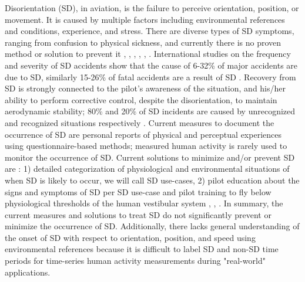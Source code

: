 \documentclass{ieeeaccess}
\begin{document}
 Disorientation (SD), in aviation, is the failure to perceive orientation, position, or movement. It is caused by multiple factors including environmental references and conditions, experience, and stress. There are diverse types of SD symptoms, ranging from confusion to physical sickness, and currently there is no proven method or solution to prevent it \cite{Bles_2008_SD}, \cite{Gibb_2010_Aviation}, \cite{Perdriel_1980_SD}, \cite{Gillingham_1993_Spatial}, \cite{Previc_2004_Spatial}, \cite{Newman_2007_SD}.  International studies on the frequency and severity of SD accidents show that the cause of 6-32\% of major accidents are due to SD, similarly 15-26\% of fatal accidents are a result of SD \cite{Newman_2007_SD}. Recovery from SD is strongly connected to the pilot's awareness of the situation, and his/her ability to perform corrective control, despite the disorientation, to maintain aerodynamic stability; 80\% and 20\% of SD incidents are caused by unrecognized and recognized situations respectively \cite{Bles_2008_SD}. Current measures to document the occurrence of SD are personal reports of physical and perceptual experiences using questionnaire-based methods; measured human activity is rarely used to monitor the occurrence of SD. Current solutions to minimize and/or prevent SD are : 1) detailed categorization of physiological and environmental situations of when SD is likely to occur, we will call SD use-cases, 2) pilot education about the signs and symptoms of SD per SD use-case and pilot training to fly below physiological thresholds of the human vestibular system  \cite{Gillingham_1993_Spatial}, \cite{Newman_2007_SD}, \cite{Previc_2004_Spatial}. In summary, the current measures and solutions to treat SD do not significantly prevent or minimize the occurrence of SD. Additionally, there lacks general understanding of the onset of SD with respect to orientation, position, and speed using environmental references because it is difficult to label SD and non-SD time periods for time-series human activity measurements during "real-world" applications.
\end{document}
